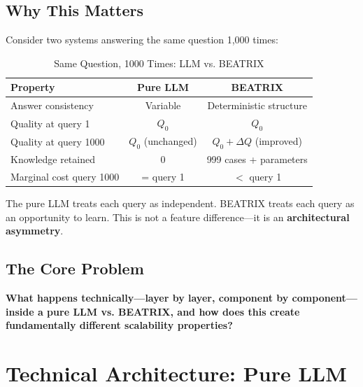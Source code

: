 \subsection{Why This Matters}

Consider two systems answering the same question 1,000 times:

\begin{table}[htbp]
\centering
\caption{Same Question, 1000 Times: LLM vs. BEATRIX}
\label{tab:bx-1000}
\renewcommand{\arraystretch}{1.4}
\begin{tabular}{@{}lcc@{}}
\toprule
\textbf{Property} & \textbf{Pure LLM} & \textbf{BEATRIX} \\
\midrule
Answer consistency & Variable & Deterministic structure \\
Quality at query 1 & $Q_0$ & $Q_0$ \\
Quality at query 1000 & $Q_0$ (unchanged) & $Q_0 + \Delta Q$ (improved) \\
Knowledge retained & 0 & 999 cases + parameters \\
Marginal cost query 1000 & = query 1 & $<$ query 1 \\
\bottomrule
\end{tabular}
\end{table}

The pure LLM treats each query as independent. BEATRIX treats each query as an opportunity to learn. This is not a feature difference---it is an \textbf{architectural asymmetry}.

\subsection{The Core Problem}

\begin{tcolorbox}[colback=red!5!white, colframe=red!75!black,
    title=The Fundamental Question]
\textbf{What happens technically---layer by layer, component by component---inside a pure LLM vs. BEATRIX, and how does this create fundamentally different scalability properties?}
\end{tcolorbox}


\section{Technical Architecture: Pure LLM}
\label{sec:bx-llm}

